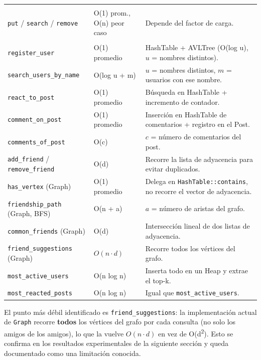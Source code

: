 \documentclass[11pt,a4paper]{article}
\begin{document}
\begin{center}
\begin{tabularx}{\textwidth}{@{}l l X@{}}
\rowcolor{titleblue!15}\multicolumn{3}{@{}l}{\textbf{HashTable<K,V>}} \\
\texttt{put} / \texttt{search} / \texttt{remove} & O(1) prom., O(n) peor caso & Depende del factor de carga. \\
\rowcolor{titleblue!15}\multicolumn{3}{@{}l}{\textbf{SocialNetwork}} \\
\texttt{register\_user} & O(1) promedio & HashTable + AVLTree (O(log u), $u$ = nombres distintos). \\
\texttt{search\_users\_by\_name} & O(log u + m) & $u$ = nombres distintos, $m$ = usuarios con ese nombre. \\
\texttt{react\_to\_post} & O(1) promedio & Búsqueda en HashTable + incremento de contador. \\
\texttt{comment\_on\_post} & O(1) promedio & Inserción en HashTable de comentarios + registro en el Post. \\
\texttt{comments\_of\_post} & O(c) & $c$ = número de comentarios del post. \\
\texttt{add\_friend} / \texttt{remove\_friend} & O(d) & Recorre la lista de adyacencia para evitar duplicados. \\
\texttt{has\_vertex} (Graph) & O(1) promedio & Delega en \texttt{HashTable::contains}, no recorre el vector de adyacencia. \\
\texttt{friendship\_path} (Graph, BFS) & O(n + a) & $a$ = número de aristas del grafo. \\
\texttt{common\_friends} (Graph) & O(d) & Intersección lineal de dos listas de adyacencia. \\
\texttt{friend\_suggestions} (Graph) & $O(n \cdot d)$ & Recorre todos los vértices del grafo. \\
\texttt{most\_active\_users} & O(n log n) & Inserta todo en un Heap y extrae el top-k. \\
\texttt{most\_reacted\_posts} & O(n log n) & Igual que \texttt{most\_active\_users}. \\
\bottomrule
\end{tabularx}
\end{center}

El punto más débil identificado es \texttt{friend\_suggestions}: la
implementación actual de \texttt{Graph} recorre \textbf{todos} los
vértices del grafo por cada consulta (no solo los amigos de los amigos),
lo que la vuelve $O(n \cdot d)$ en vez de O(d\textsuperscript{2}). Esto se
confirma en los resultados experimentales de la siguiente sección y
queda documentado como una limitación conocida.
\end{document}
